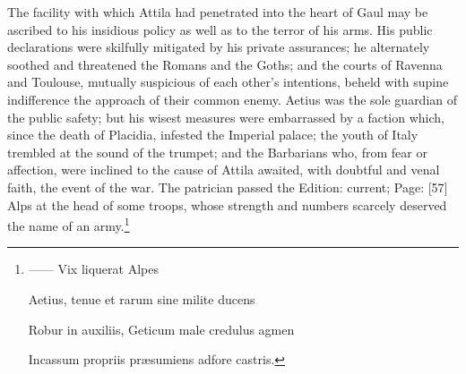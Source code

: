 The facility with which Attila had penetrated into the heart of Gaul may be ascribed to his insidious policy as well as to the terror of his arms. His public declarations were skilfully mitigated by his private assurances; he alternately soothed and threatened the Romans and the Goths; and the courts of Ravenna and Toulouse, mutually suspicious of each other\texthebrew{}’s intentions, beheld with supine indifference the approach of their common enemy. Aetius was the sole guardian of the public safety; but his wisest measures were embarrassed by a faction which, since the death of Placidia, infested the Imperial palace; the youth of Italy trembled at the sound of the trumpet; and the Barbarians who, from fear or affection, were inclined to the cause of Attila awaited, with doubtful and venal faith, the event of the war. The patrician passed the Edition: current; Page: [57] Alps at the head of some troops, whose strength and numbers scarcely deserved the name of an army.\footnote{\texthebrew{——} Vix liquerat Alpes

Aetius, tenue et rarum sine milite ducens

Robur in auxiliis, Geticum male credulus agmen

Incassum propriis præsumiens adfore castris.

}
